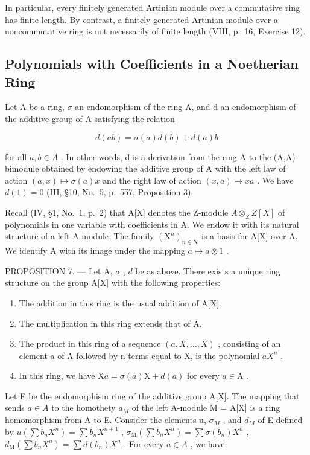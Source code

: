 In particular, every finitely generated Artinian module over a commutative ring has finite length. By contrast, a finitely generated Artinian module over a noncommutative ring is not necessarily of finite length (VIII, p.~16, Exercise 12).

\subsection{Polynomials with Coefficients in a Noetherian Ring}

Let A be a ring, \(\sigma\) an endomorphism of the ring A, and d an endomorphism of the additive group of A satisfying the relation

\[
d (a b) = \sigma (a) d (b) + d (a) b\tag{1}
\]

for all \(a, b \in A\) . In other words, d is a derivation from the ring A to the (A,A)-bimodule obtained by endowing the additive group of A with the left law of action \((a, x) \mapsto \sigma(a)x\) and the right law of action \((x, a) \mapsto xa\) . We have \(d(1) = 0\) (III, §10, No.~5, p.~557, Proposition 3).

Recall (IV, §1, No.~1, p.~2) that A{[}X{]} denotes the Z-module \(A \otimes_{Z} Z[X]\) of polynomials in one variable with coefficients in A. We endow it with its natural structure of a left A-module. The family \((\mathrm{X}^{n})_{n \in \mathbf{N}}\) is a basis for A{[}X{]} over A. We identify A with its image under the mapping \(a \mapsto a \otimes 1\) .

PROPOSITION 7. --- Let A, \(\sigma\) , \(d\) be as above. There exists a unique ring structure on the group A{[}X{]} with the following properties:

\begin{enumerate}
\def\labelenumi{\alph{enumi})}
\item
  The addition in this ring is the usual addition of A{[}X{]}.
\item
  The multiplication in this ring extends that of A.
\item
  The product in this ring of a sequence \((a,X,\ldots,X)\) , consisting of an element a of A followed by n terms equal to X, is the polynomial \(aX^{n}\) .
\item
  In this ring, we have \(\mathrm{X}a = \sigma(a)\mathrm{X} + d(a)\) for every \(a \in \mathrm{A}\) .
\end{enumerate}

Let E be the endomorphism ring of the additive group A{[}X{]}. The mapping that sends \(a \in A\) to the homothety \(a_{M}\) of the left A-module M = A{[}X{]} is a ring homomorphism from A to E. Consider the elements u, \(\sigma_{M}\) , and \(d_{M}\) of E defined by \(u(\sum b_{n}X^{n}) = \sum b_{n}X^{n+1}\) , \(\sigma_{\mathrm{M}}(\sum b_{n}X^{n}) = \sum \sigma(b_{n})X^{n}\) , \(d_{\mathrm{M}}(\sum b_{n}X^{n}) = \sum d(b_{n})X^{n}\) . For every \(a \in A\) , we have

